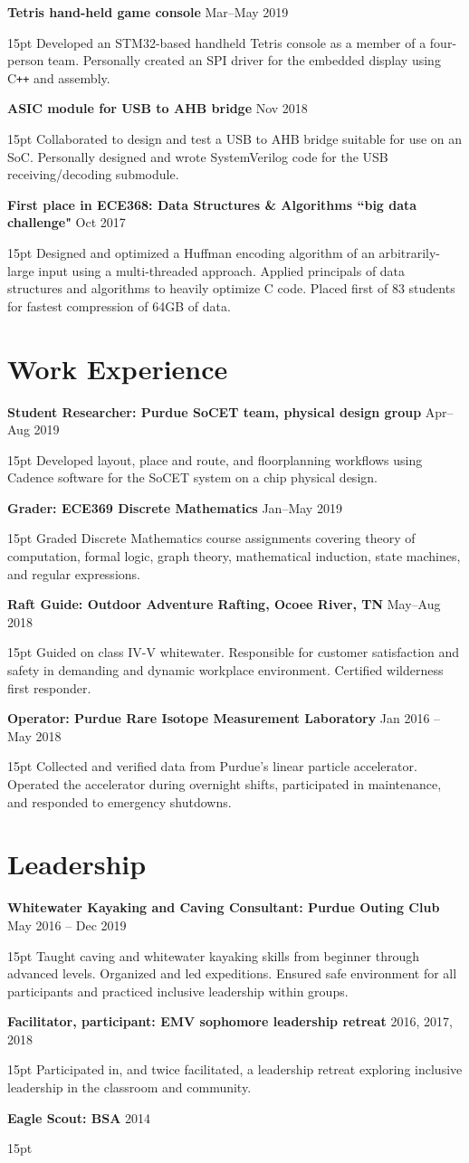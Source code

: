 \documentclass[10pt,letterpaper]{article}
\newcommand{\resumeItem}[3]{
	\textbf{#1} \hfill #2\\
	\begin{adjustwidth}{15pt}{}
	#3
	\end{adjustwidth}
}
\begin{document}
\resumeItem
{Tetris hand-held game console}
{Mar--May 2019}
{Developed an STM32-based handheld Tetris console as a member of a four-person team. Personally created an SPI driver for the embedded display using C\texttt{++} and assembly.}

\resumeItem
{ASIC module for USB to AHB bridge}
{Nov 2018}
{Collaborated to design and test a USB to AHB bridge suitable for use on an SoC. Personally designed and wrote SystemVerilog code for the USB receiving/decoding submodule.}

\resumeItem
{First place in ECE368: Data Structures \& Algorithms ``big data challenge"}
{Oct 2017}
{Designed and optimized a Huffman encoding algorithm of an arbitrarily-large input using a multi-threaded approach. Applied principals of data structures and algorithms to heavily optimize C code. Placed first of 83 students for fastest compression of 64GB of data.}


\section*{Work Experience}
\resumeItem
{Student Researcher: Purdue SoCET team, physical design group}
{Apr--Aug 2019}
{Developed layout, place and route, and floorplanning workflows using Cadence software for the SoCET system on a chip physical design.}

\resumeItem
{Grader: ECE369 Discrete Mathematics}
{Jan--May 2019}
{Graded Discrete Mathematics course assignments covering theory of computation, formal logic, graph theory, mathematical induction, state machines, and regular expressions.}

\resumeItem
{Raft Guide: Outdoor Adventure Rafting, Ocoee River, TN}
{May--Aug 2018}
{Guided on class IV-V whitewater. Responsible for customer satisfaction and safety in demanding and dynamic workplace environment. Certified wilderness first responder.}

\resumeItem
{Operator: Purdue Rare Isotope Measurement Laboratory}
{Jan 2016 -- May 2018}
{Collected and verified data from Purdue's linear particle accelerator. Operated the accelerator during overnight shifts, participated in maintenance, and responded to emergency shutdowns.}


\section*{Leadership}
\resumeItem
{Whitewater Kayaking and Caving Consultant: Purdue Outing Club}
{May 2016 -- Dec 2019}
{Taught caving and whitewater kayaking skills from beginner through advanced levels. Organized and led expeditions. Ensured safe environment for all participants and practiced inclusive leadership within groups.}

\resumeItem
{Facilitator, participant: EMV sophomore leadership retreat}
{2016, 2017, 2018}
{Participated in, and twice facilitated, a leadership retreat exploring inclusive leadership in the classroom and community.}

\resumeItem
{Eagle Scout: BSA}
{2014}
{}
\end{document}

